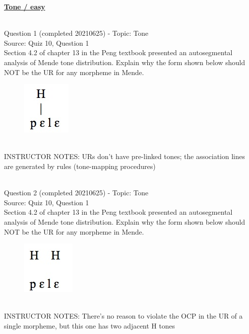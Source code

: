 \documentclass[12pt]{article}
\begin{document}
\newpage\textbf{\underline{\huge Tone / easy\\}}

~\\

{\large Question 1} (completed 20210625) - Topic: Tone\\
Source: Quiz 10, Question 1\\

Section 4.2 of chapter 13 in the Peng textbook presented an autosegmental analysis of Mende tone distribution. Explain why the form shown below should NOT be the UR for any morpheme in Mende.\\

\begin{figure}[H]
\includegraphics{../images/mende_house_a.png}
\end{figure}

~\\
INSTRUCTOR NOTES: URs don't have pre-linked tones; the association lines are generated by rules (tone-mapping procedures)


~\\

{\large Question 2} (completed 20210625) - Topic: Tone\\
Source: Quiz 10, Question 1\\

Section 4.2 of chapter 13 in the Peng textbook presented an autosegmental analysis of Mende tone distribution. Explain why the form shown below should NOT be the UR for any morpheme in Mende.\\

\begin{figure}[H]
\includegraphics{../images/mende_house_b.png}
\end{figure}

~\\
INSTRUCTOR NOTES: There's no reason to violate the OCP in the UR of a single morpheme, but this one has two adjacent H tones
\end{document}
